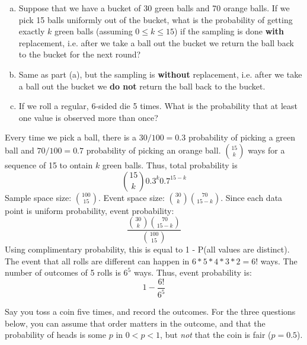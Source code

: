 \documentclass[11pt]{article}
\begin{document}

\begin{enumerate}[(a)]
\item Suppose that we have a bucket of 30 green balls and 70 orange balls. If we pick 15 balls uniformly out of the bucket, what is the probability of getting exactly $k$ green balls (assuming $0 \leq k \leq 15$) if the sampling is done \textbf{with} replacement, i.e. after we take a ball out the bucket we return the ball back to the bucket for the next round?
    

\item Same as part (a), but the sampling is \textbf{without} replacement, i.e. after we take a ball out the bucket we \textbf{do not} return the ball back to the bucket.
    

\item If we roll a regular, 6-sided die 5 times. What is the probability that at least one value is observed more than once?
    

\end{enumerate}

\begin{solution}\begin{Parts}
\Part Every time we pick a ball, there is a $30/100 = 0.3$ probability of picking a green ball and $70/100=0.7$ probability of picking an orange ball.
$\binom{15}{k}$ ways for a sequence of 15 to ontain $k$ green balls.
Thus, total probability is $$\binom{15}{k}0.3^k0.7^{15-k}$$
\Part Sample space size: $\binom{100}{15}$.
Event space size: $\binom{30}{k}\binom{70}{15-k}$.
Since each data point is uniform probability, event probability: 
$$\frac{\binom{30}{k}\binom{70}{15-k}}{\binom{100}{15}}$$ 
\Part Using complimentary probability, this is equal to 1 - P(all values are distinct).
The event that all rolls are different can happen in $6*5*4*3*2 = 6!$ ways.
The number of outcomes of 5 rolls is $6^5$ ways.
Thus, event probability is: $$1-\frac{6!}{6^5}$$
\end{Parts}\end{solution}\newpage




Say you toss a coin five times, and record the outcomes. For the three questions
below, you can assume that order matters in the outcome, and that the
probability of heads is some $p$ in $0 < p < 1$, but \textit{not} that the coin
is fair ($p = 0.5$).
\end{document}
